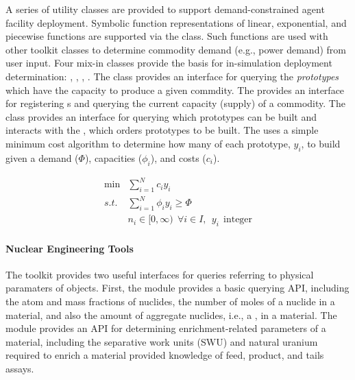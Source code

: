 A series of utility classes are provided to support demand-constrained agent
facility deployment. Symbolic function representations of linear,
exponential, and piecewise functions are supported via the
 class. Such functions are used with other toolkit
classes to determine commodity demand (e.g., power demand) from user input. Four
mix-in classes provide the basis for in-simulation deployment determination:
, , ,
. The  class provides an
interface for querying the \textit{prototypes} which have the
capacity to produce a given commdity. The 
provides an interface for registering s and querying
the current capacity (supply) of a commodity. The  class provides
an interface for querying which prototypes can be built and interacts with the
, which orders prototypes to be built. The
 uses a simple minimum cost algorithm to determine how
many of each prototype, $y_i$, to build given a demand ($\Phi$), capacities
($\phi_i$), and costs ($c_i$).

\begin{equation}
\begin{aligned}
 \min & \sum_{i=1}^{N}c_i y_i \\
 s.t. & \sum_{i=1}^{N}\phi_i y_i \ge \Phi \\
      & n_i \in [0,\infty) \:\: \forall i \in I, \:\: y_i \:\: \text{integer} 
\end{aligned}
\end{equation}

\paragraph{Nuclear Engineering Tools}

The \Cyclus toolkit provides two useful interfaces for queries referring to physical paramaters of 
objects. First, the  module
provides a basic querying \gls{API}, including the atom and mass fractions of
nuclides, the number of moles of a nuclide in a material, and also the amount of
aggregate nuclides, i.e., a , in a material. The
 module provides an \gls{API} for determining enrichment-related
parameters of a material, including the separative work units (SWU) and natural
uranium required to enrich a material provided knowledge of feed, product, and tails
assays.

